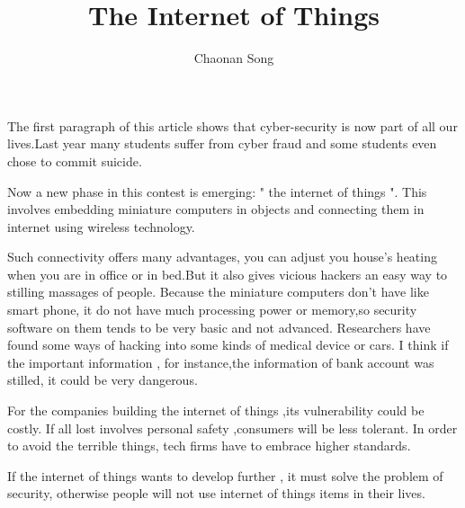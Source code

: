 \documentclass{ctexart}
\title{The Internet of Things}
\author{Chaonan Song}
\begin{document}
\maketitle
\par The first paragraph of this article shows that cyber-security is now part of all our lives.Last year many students suffer from cyber fraud and some students even chose to commit suicide.
\par Now a new phase in this contest is emerging: " the internet of things ". This involves embedding miniature computers in objects and connecting them in internet using wireless technology.
\par Such connectivity offers many advantages, you can adjust you house's heating when you are in office or in bed.But it also gives vicious hackers an easy way to stilling massages of people. Because the miniature computers don't have like smart phone, it do not have much processing power or memory,so security software on them tends to be very basic and not advanced. Researchers have found some ways of hacking into some kinds of medical device or cars. I think if the important information , for instance,the information of bank account was stilled, it could be very dangerous.
\par For the companies building the internet of things ,its vulnerability could be costly. If all lost involves personal safety ,consumers will be less tolerant. In order to avoid the terrible things, tech firms have to embrace higher standards.
\par If the internet of things wants to develop further , it must solve the problem of security, otherwise people will not use internet of things items in their lives.    
\end{document}
